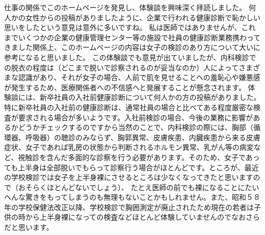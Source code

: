 仕事の関係でこのホームページを発見し、体験談を興味深く拝読しました。
何人かの女性からの投稿がありましたように、企業で行われる健康診断で恥かしい思いをしたという意見は意外に多いですね。
私は医師ではありませんが、これまでいくつかの企業の健康管理センター等の施設で社員の健康診断業務携わってきました関係上、このホームページの内容は女子の検診のあり方について大いに参考になると思いました。
この体験談でも意見が出ていましたが、内科検診での脱衣の程度は（どこまで脱いで診察されるのが妥当なのか）人によってさまざまな認識があり、それが女子の場合、人前で肌を見せることへの羞恥心や嫌悪感が発生するため、医療関係者への不信感へと発展することが懸念されます。
体験談には、新卒社員の入社前健康診断について何人かの方の投稿がありました。
特に新卒社員の入社前の健康診断は、通常社員の場合と比べてある程度厳密な検査が要求される場合が多いようです。入社前検診の場合、今後の業務に影響があるかどうかチェックするのですから当然のことで、内科検診の際には、胸部（循環器、呼吸器）の聴診のみならず、胸郭異常、皮膚疾患、内臓疾患から来る皮膚症状、女子であれば乳房の状態から判断されるホルモン異常、乳がん等の病変など、視触診を含んだ多面的な診察を行う必要があります。そのため、女子であっても上半身は全部脱いでもらって診察行う場合がほとんどです。ところが、最近の学校検診では女子を上半身裸にさせるところは少なくなってきたと思いますので（おそらくほとんどないでしょう）、
たとえ医師の前でも裸になることにたいへんな驚きをもってしまうのも無理もないことかもしれません。また、昭和５８年の学校保健法改正以降、学校検診で胸囲測定が廃止されたため現在の若者は子供の時から上半身裸になっての検査などほとんど体験していませんのでなおさらだと思います。

